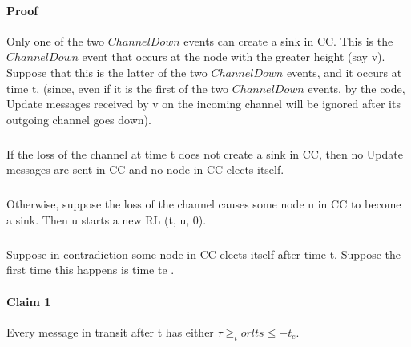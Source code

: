 \paragraph{Proof}Only one of the two $ChannelDown$ events can create a sink in CC. This is the $ChannelDown$ event that occurs at the node with the greater height (say v). Suppose that this is the latter of the two $ChannelDown$ events, and it occurs at time t, (since, even if it is the first of the two $ChannelDown$ events, by the code, Update messages received by v on the incoming channel will be ignored after its outgoing channel goes down).
\subparagraph{}If the loss of the channel at time t does not create a sink in CC, then no Update messages are sent in CC and no node in CC elects itself.
\subparagraph{}Otherwise, suppose the loss of the channel causes some node u in CC to become a sink. Then u starts a new RL (t, u, 0).
\subparagraph{}Suppose in contradiction some node in CC elects itself after time t. Suppose the first time this happens is time te .
\paragraph{Claim 1}Every message in transit after t has either $\tau \geq _t or lts \leq -t_e$.
